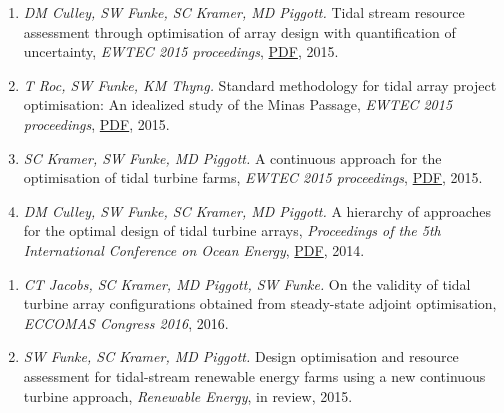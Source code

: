 \documentclass[11pt]{article}
\begin{document}
\begin{enumerate}
    \item \textit{DM Culley, SW Funke, SC Kramer, MD Piggott.} Tidal stream resource assessment through optimisation of array design with quantification of uncertainty, \textit{EWTEC 2015 proceedings}, \href{https://github.com/funsim/cv/raw/master/publications/culley_ewtec_2015.pdf}{PDF}, 2015.
    \item \textit{T Roc, SW Funke, KM Thyng.} Standard methodology for tidal array project optimisation: An idealized study of the Minas Passage, \textit{EWTEC 2015 proceedings}, \href{https://github.com/funsim/cv/raw/master/publications/roc_ewtec_2015.pdf}{PDF}, 2015.
    \item \textit{SC Kramer, SW Funke, MD Piggott.} A continuous approach for the optimisation of tidal turbine farms, \textit{EWTEC 2015 proceedings}, \href{https://github.com/funsim/cv/raw/master/publications/kramer_ewtec_2015.pdf}{PDF}, 2015.
    \item \textit{DM Culley, SW Funke, SC Kramer, MD Piggott.} A hierarchy of approaches for the optimal design of tidal turbine arrays, \textit{Proceedings of the 5th International Conference on Ocean Energy}, \href{https://github.com/funsim/cv/raw/master/publications/culley_ewtec_2015.pdf}{PDF}, 2014.
\end{enumerate}

\begin{enumerate}
\item \textit{CT Jacobs, SC Kramer, MD Piggott, SW Funke.} On the validity of tidal turbine array configurations obtained from steady-state adjoint optimisation, \textit{ECCOMAS Congress 2016}, 2016.
\item \textit{SW Funke, SC Kramer, MD Piggott.} Design optimisation and resource assessment for tidal-stream renewable energy farms using a new continuous turbine approach, \textit{Renewable Energy}, in review, 2015.
\end{enumerate}

\end{document}
